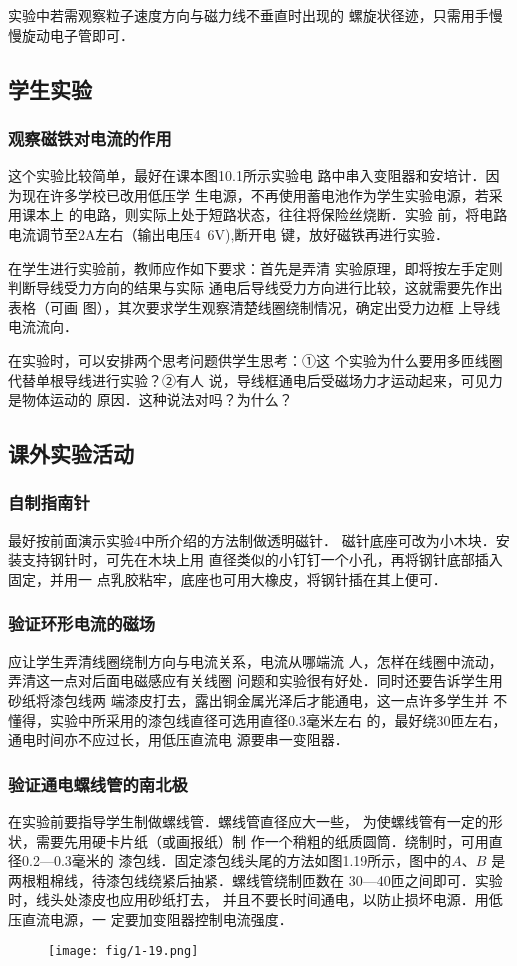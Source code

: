 实验中若需观察粒子速度方向与磁力线不垂直时出现的
螺旋状径迹，只需用手慢慢旋动电子管即可．

\subsection{学生实验}
\subsubsection{观察磁铁对电流的作用}
这个实验比较简单，最好在课本图10.1所示实验电
路中串入变阻器和安培计．因为现在许多学校已改用低压学
生电源，不再使用蓄电池作为学生实验电源，若采用课本上
的电路，则实际上处于短路状态，往往将保险丝烧断．实验
前，将电路电流调节至2A左右（输出电压4~6V),断开电
键，放好磁铁再进行实验．

在学生进行实验前，教师应作如下要求：首先是弄清
实验原理，即将按左手定则判断导线受力方向的结果与实际
通电后导线受力方向进行比较，这就需要先作出表格（可画
图），其次要求学生观察清楚线圈绕制情况，确定出受力边框
上导线电流流向．

在实验时，可以安排两个思考问题供学生思考：①这
个实验为什么要用多匝线圈代替单根导线进行实验？②有人
说，导线框通电后受磁场力才运动起来，可见力是物体运动的
原因．这种说法对吗？为什么？

\subsection{课外实验活动}
\subsubsection{自制指南针}
最好按前面演示实验4中所介绍的方法制做透明磁针．
磁针底座可改为小木块．安装支持钢针时，可先在木块上用
直径类似的小钉钉一个小孔，再将钢针底部插入固定，并用一
点乳胶粘牢，底座也可用大橡皮，将钢针插在其上便可．

\subsubsection{验证环形电流的磁场}
应让学生弄清线圈绕制方向与电流关系，电流从哪端流
人，怎样在线圈中流动，弄清这一点对后面电磁感应有关线圈
问题和实验很有好处．同时还要告诉学生用砂纸将漆包线两
端漆皮打去，露出铜金属光泽后才能通电，这一点许多学生并
不懂得，实验中所采用的漆包线直径可选用直径0.3毫米左右
的，最好绕30匝左右，通电时间亦不应过长，用低压直流电
源要串一变阻器．

\subsubsection{验证通电螺线管的南北极}
在实验前要指导学生制做螺线管．螺线管直径应大一些，
为使螺线管有一定的形状，需要先用硬卡片纸（或画报纸）制
作一个稍粗的纸质圆筒．绕制时，可用直径0.2—0.3毫米的
漆包线．固定漆包线头尾的方法如图1.19所示，图中的$A$、$B$
是两根粗棉线，待漆包线绕紧后抽紧．螺线管绕制匝数在
30—40匝之间即可．实验时，线头处漆皮也应用砂纸打去，
并且不要长时间通电，以防止损坏电源．用低压直流电源，一
定要加变阻器控制电流强度．
\begin{figure}[htp]
    \centering
\texttt{[image: fig/1-19.png]}
    \caption{}
\end{figure}

